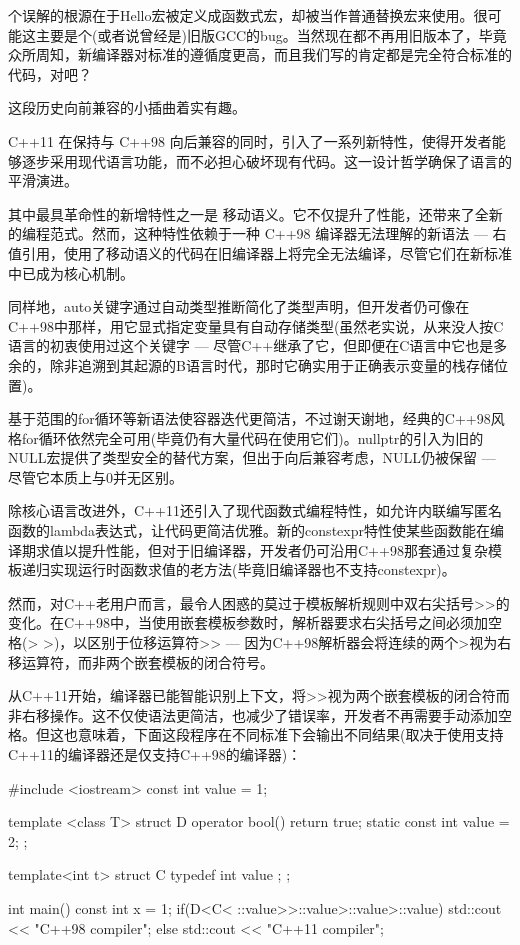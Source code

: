 个误解的根源在于Hello宏被定义成函数式宏，却被当作普通替换宏来使用。很可能这主要是个(或者说曾经是)旧版GCC的bug。当然现在都不再用旧版本了，毕竟众所周知，新编译器对标准的遵循度更高，而且我们写的肯定都是完全符合标准的代码，对吧？

这段历史向前兼容的小插曲着实有趣。


C++11 在保持与 C++98 向后兼容的同时，引入了一系列新特性，使得开发者能够逐步采用现代语言功能，而不必担心破坏现有代码。这一设计哲学确保了语言的平滑演进。

其中最具革命性的新增特性之一是 移动语义。它不仅提升了性能，还带来了全新的编程范式。然而，这种特性依赖于一种 C++98 编译器无法理解的新语法 --- 右值引用，使用了移动语义的代码在旧编译器上将完全无法编译，尽管它们在新标准中已成为核心机制。

同样地，auto关键字通过自动类型推断简化了类型声明，但开发者仍可像在C++98中那样，用它显式指定变量具有自动存储类型(虽然老实说，从来没人按C语言的初衷使用过这个关键字 --- 尽管C++继承了它，但即便在C语言中它也是多余的，除非追溯到其起源的B语言时代，那时它确实用于正确表示变量的栈存储位置)。

基于范围的for循环等新语法使容器迭代更简洁，不过谢天谢地，经典的C++98风格for循环依然完全可用(毕竟仍有大量代码在使用它们)。nullptr的引入为旧的NULL宏提供了类型安全的替代方案，但出于向后兼容考虑，NULL仍被保留 --- 尽管它本质上与0并无区别。

除核心语言改进外，C++11还引入了现代函数式编程特性，如允许内联编写匿名函数的lambda表达式，让代码更简洁优雅。新的constexpr特性使某些函数能在编译期求值以提升性能，但对于旧编译器，开发者仍可沿用C++98那套通过复杂模板递归实现运行时函数求值的老方法(毕竟旧编译器也不支持constexpr)。

然而，对C++老用户而言，最令人困惑的莫过于模板解析规则中双右尖括号>{}>的变化。在C++98中，当使用嵌套模板参数时，解析器要求右尖括号之间必须加空格(> >)，以区别于位移运算符>{}> --- 因为C++98解析器会将连续的两个>视为右移运算符，而非两个嵌套模板的闭合符号。

从C++11开始，编译器已能智能识别上下文，将>{}>视为两个嵌套模板的闭合符而非右移操作。这不仅使语法更简洁，也减少了错误率，开发者不再需要手动添加空格。但这也意味着，下面这段程序在不同标准下会输出不同结果(取决于使用支持C++11的编译器还是仅支持C++98的编译器)：

\begin{cpp}
#include <iostream>
const int value = 1;

template <class T>
struct D {
  operator bool() {return true;}
  static const int value = 2;
};

template<int t> struct C {
  typedef int value ;
};

int main() {
  const int x = 1;
  if(D<C< ::value>>::value>::value>::value) {
    std::cout << "C++98 compiler";
  } else {
    std::cout << "C++11 compiler";
  }
}
\end{cpp}

